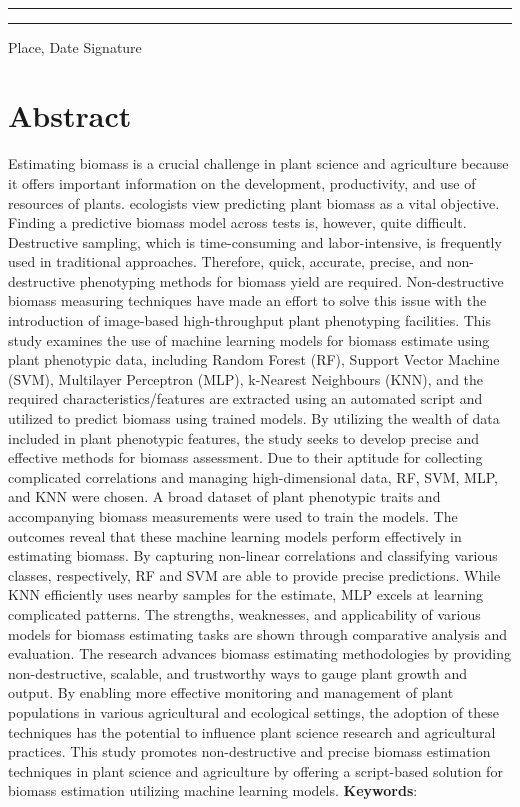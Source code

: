 \documentclass[a4paper,11pt]{report}%
\renewcommand{\\}{\vspace*{0.5\baselineskip} \newline}
\begin{document}
~\\
~\\
\rule{0.35\textwidth}{0.4pt} \hspace*{3cm} \rule{0.45\textwidth}{0.4pt} \newline
Place, Date	\hspace*{6.3cm}	Signature

\newpage
\chapter*{Abstract}

Estimating biomass is a crucial challenge in plant science and agriculture because it offers important information on the development, productivity, and use of resources of plants. ecologists view predicting plant biomass as a vital objective. Finding a predictive biomass model across tests is, however, quite difficult. Destructive sampling, which is time-consuming and labor-intensive, is frequently used in traditional approaches. Therefore, quick, accurate, precise, and non-destructive phenotyping methods for biomass yield are required. Non-destructive biomass measuring techniques have made an effort to solve this issue with the introduction of image-based high-throughput plant phenotyping facilities. This study examines the use of machine learning models for biomass estimate using plant phenotypic data, including Random Forest (RF), Support Vector Machine (SVM), Multilayer Perceptron (MLP), k-Nearest Neighbours (KNN), and the required characteristics/features are extracted using an automated script and utilized to predict biomass using trained models. By utilizing the wealth of data included in plant phenotypic features, the study seeks to develop precise and effective methods for biomass assessment. Due to their aptitude for collecting complicated correlations and managing high-dimensional data, RF, SVM, MLP, and KNN were chosen. A broad dataset of plant phenotypic traits and accompanying biomass measurements were used to train the models. The outcomes reveal that these machine learning models perform effectively in estimating biomass. By capturing non-linear correlations and classifying various classes, respectively, RF and SVM are able to provide precise predictions. While KNN efficiently uses nearby samples for the estimate, MLP excels at learning complicated patterns. The strengths, weaknesses, and applicability of various models for biomass estimating tasks are shown through comparative analysis and evaluation. The research advances biomass estimating methodologies by providing non-destructive, scalable, and trustworthy ways to gauge plant growth and output. By enabling more effective monitoring and management of plant populations in various agricultural and ecological settings, the adoption of these techniques has the potential to influence plant science research and agricultural practices. This study promotes non-destructive and precise biomass estimation techniques in plant science and agriculture by offering a script-based solution for biomass estimation utilizing machine learning models.
\\ \\
\textbf{Keywords}: 
\newpage
\end{document}
